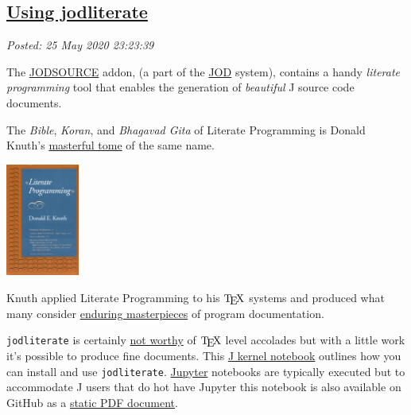 

%

\subsection*{\href{https://analyzethedatanotthedrivel.org/2020/05/25/using-jodliterate/}{Using jodliterate}}

\noindent\emph{Posted: 25 May 2020 23:23:39}
\vspace{6pt}

The
\href{https://code.jsoftware.com/wiki/Addons/general/jodsource}{JODSOURCE}
addon, (a part of the
\href{https://code.jsoftware.com/wiki/Addons/general/jod}{JOD} system),
contains a handy \emph{literate programming} tool that enables the
generation of \emph{beautiful} J source code documents.

The \emph{Bible}, \emph{Koran}, and \emph{Bhagavad Gita} of Literate
Programming is Donald Knuth's
\href{https://www.goodreads.com/book/show/112245.Literate_Programming}{masterful
tome} of the same name.


\captionsetup[floatingfigure]{labelformat=empty}
\begin{floatingfigure}[l]{0.22\textwidth}
\centering
\includegraphics[width=0.18\textwidth]{inclusions/literate_programming_book_cover_smaller.png}
\end{floatingfigure}Knuth applied Literate Programming to his \(\TeX\) systems and produced
what many consider
\href{https://www.amazon.com/TeXbook-Donald-Knuth/dp/0201134489\#customerReviews}{enduring
masterpieces} of program documentation.

\texttt{jodliterate} is certainly
\href{https://www.youtube.com/watch?v=o5FT3IGXtAk}{not worthy} of
\(\TeX\) level accolades but with a little work it's possible to produce
fine documents. This \href{https://github.com/martin-saurer/jkernel}{J
kernel notebook} outlines how you can install and use
\texttt{jodliterate}. \href{https://jupyter.org/}{Jupyter} notebooks are
typically executed but to accommodate J users that do hot have Jupyter
this notebook is also available on GitHub as a
\href{https://github.com/bakerjd99/jacks/blob/master/jodliterate/UsingJodliterate.pdf}{static
PDF document}.

